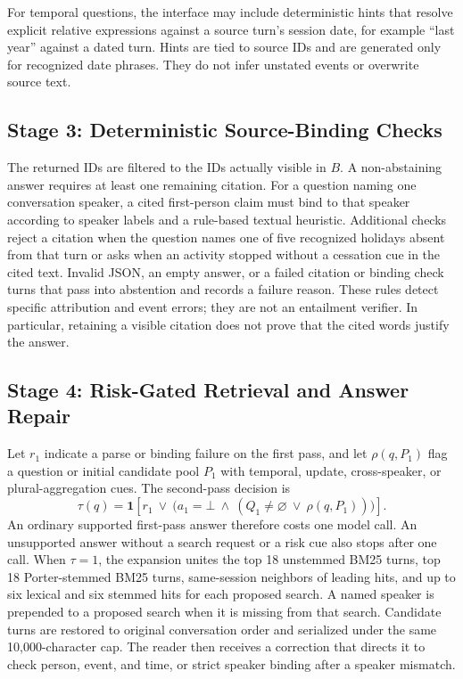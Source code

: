 \documentclass[11pt]{article}
\newcommand{\botans}{\bot}
\begin{document}
For temporal questions, the interface may include deterministic hints that
resolve explicit relative expressions against a source turn's session date,
for example ``last year'' against a dated turn. Hints are tied to source IDs
and are generated only for recognized date phrases. They do not infer
unstated events or overwrite source text.

\subsection{Stage 3: Deterministic Source-Binding Checks}

The returned IDs are filtered to the IDs actually visible in $B$. A
non-abstaining answer requires at least one remaining citation. For a
question naming one conversation speaker, a cited first-person claim must
bind to that speaker according to speaker labels and a rule-based textual
heuristic. Additional checks reject a citation when the question names one
of five recognized holidays absent from that turn or asks when an activity stopped
without a cessation cue in the cited text. Invalid JSON, an empty answer,
or a failed citation or binding check turns that pass into abstention and
records a failure reason. These rules detect specific attribution and event
errors; they are not an entailment verifier. In particular, retaining a
visible citation does not prove that the cited words justify the answer.

\subsection{Stage 4: Risk-Gated Retrieval and Answer Repair}

Let $r_1$ indicate a parse or binding failure on the first pass, and let
$\rho(q,P_1)$ flag a question or initial candidate pool $P_1$ with temporal,
update, cross-speaker, or plural-aggregation cues. The second-pass decision
is
\begin{equation}
\tau(q)=\mathbf{1}\!\left[
r_1\ \lor\
\bigl(a_1=\botans\ \land\ (Q_1\neq\varnothing\ \lor\ \rho(q,P_1))\bigr)
\right].
\label{eq:gate}
\end{equation}
An ordinary supported first-pass answer therefore costs one model call.
An unsupported answer without a search request or a risk cue also stops
after one call. When $\tau=1$, the expansion unites the top 18 unstemmed
BM25 turns, top 18 Porter-stemmed BM25 turns, same-session neighbors of
leading hits, and up to six lexical and six stemmed hits for each proposed
search. A named speaker is prepended to a proposed search when it is missing
from that search. Candidate turns are restored to original conversation
order and serialized under the same 10,000-character cap. The reader then
receives a correction that directs it to check person, event, and time, or
strict speaker binding after a speaker mismatch.
\end{document}
